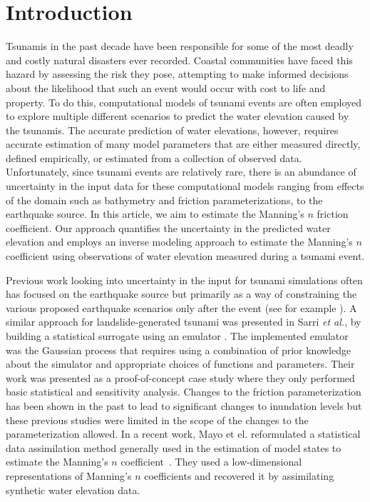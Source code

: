 
\section{Introduction}
\label{sec:intro}
Tsunamis in the past decade have been responsible for some of the most  deadly
and costly natural disasters ever recorded. Coastal communities  have faced this
hazard by assessing the risk they pose, attempting  to make informed decisions
about the likelihood that such an event would  occur with cost to life and
property.  To do this, computational models of  tsunami events are often
employed to explore multiple different scenarios to predict the water elevation
caused by the tsunamis. The accurate prediction  of water elevations, however, requires
accurate estimation of many model parameters that are either measured directly,
defined empirically, or estimated from a collection of observed data. Unfortunately,
since tsunami events are relatively rare,  there is an abundance of uncertainty
in the input data for these computational  models ranging from effects of the
domain such as bathymetry and friction parameterizations,  to the earthquake
source.  In this article, we aim to estimate the Manning's $n$ friction
coefficient. Our approach quantifies the uncertainty in the predicted water
elevation  and employs an inverse modeling approach to estimate the Manning's
$n$ coefficient using observations of water elevation measured during a tsunami event.

Previous work looking into uncertainty in the input for tsunami simulations
often has focused on the earthquake source but primarily as a way of
constraining the various proposed earthquake scenarios only after the event (see
for example \cite{MacInnes:2013cr}).  A similar approach for landslide-generated
tsunami was presented in Sarri \emph{et al.}, by building a statistical surrogate
using an emulator \cite{Sarri2012}. The implemented emulator was the Gaussian
process that requires using a combination of prior knowledge about the simulator
and appropriate choices of functions and parameters. Their work was presented as
a proof-of-concept case study where they only performed basic statistical and
sensitivity analysis.  Changes to the friction parameterization has been shown in 
the past to lead to significant changes to inundation levels \cite{Myers:2001el,Jakeman:2010hk} 
but these previous studies were limited in the scope of the changes to the parameterization allowed.  
In a recent work, Mayo et el. reformulated a statistical data assimilation method
generally used in the estimation of model states to estimate the Manning's $n$
coefficient~\cite{Mayo2013}. They used a low-dimensional representations of
Manning's $n$ coefficients and recovered it by assimilating synthetic water elevation data.

